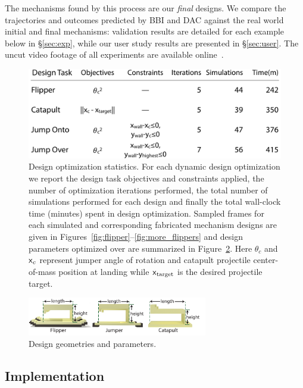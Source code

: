 The mechanisms found by this process are our \emph{final} designs. We compare the trajectories and outcomes predicted by BBI and DAC against the real world initial and final mechanisms: validation results are detailed for each example below in \S\ref{sec:exp}, while our user study results are presented in \S\ref{sec:user}. The uncut video footage of all experiments are available online~\cite{Video}.

\begin{figure}[h]
	\centering
\includegraphics[width=0.7\columnwidth]{figs/optTable.pdf}
\caption{Design optimization statistics. For each dynamic design optimization we report the design task objectives and constraints applied, the number of optimization iterations performed, the total number of simulations performed for each design and finally the total wall-clock time (minutes) spent in design optimization. Sampled frames for each simulated and corresponding fabricated mechanism designs are given in Figures~\ref{fig:flipper}--\ref{fig:more_flippers} and design parameters optimized over are summarized in Figure~\ref{fig:params}. Here $\theta_c$ and $\mbox{\textbf{{$\mathsf x$}}}_c$ represent jumper angle of rotation and catapult projectile center-of-mass position at landing while $\mbox{\textbf{{$\mathsf x$}}}_{\text{target}}$ is the desired projectile target.
}
\label{table:perf}	
\end{figure}

\begin{figure}[h!]
\centering
\includegraphics[width=0.7\textwidth]{figs/param.pdf}
\caption{Design geometries and parameters.}
\label{fig:params}
\end{figure}	

\subsection{Implementation}

